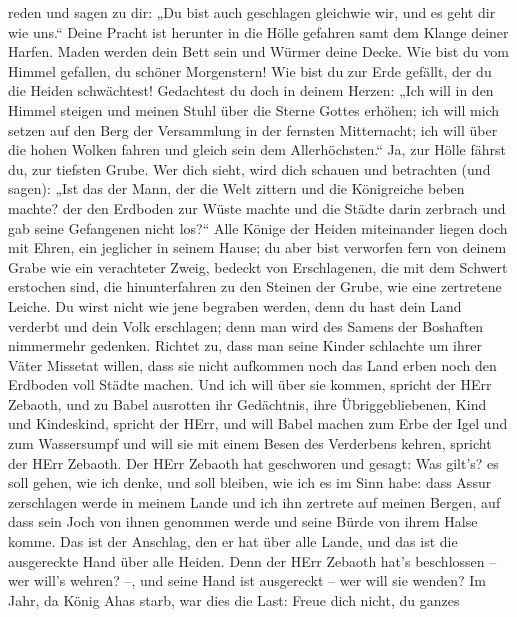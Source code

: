 reden und sagen zu dir: „Du bist auch geschlagen gleichwie wir, und es
geht dir wie uns.``  Deine Pracht ist herunter in die Hölle
gefahren samt dem Klange deiner Harfen. Maden werden dein Bett sein und
Würmer deine Decke.  Wie bist du vom Himmel gefallen, du
schöner Morgenstern! Wie bist du zur Erde gefällt, der du die Heiden
schwächtest!  Gedachtest du doch in deinem Herzen: „Ich
will in den Himmel steigen und meinen Stuhl über die Sterne Gottes
erhöhen;  ich will mich setzen auf den Berg der Versammlung
in der fernsten Mitternacht; ich will über die hohen Wolken fahren und
gleich sein dem Allerhöchsten.``  Ja, zur Hölle fährst du,
zur tiefsten Grube.  Wer dich sieht, wird dich schauen und
betrachten (und sagen): „Ist das der Mann, der die Welt zittern und die
Königreiche beben machte?  der den Erdboden zur Wüste
machte und die Städte darin zerbrach und gab seine Gefangenen nicht
los?{}``  Alle Könige der Heiden miteinander liegen doch
mit Ehren, ein jeglicher in seinem Hause;  du aber bist
verworfen fern von deinem Grabe wie ein verachteter Zweig, bedeckt von
Erschlagenen, die mit dem Schwert erstochen sind, die hinunterfahren zu
den Steinen der Grube, wie eine zertretene Leiche.  Du
wirst nicht wie jene begraben werden, denn du hast dein Land verderbt
und dein Volk erschlagen; denn man wird des Samens der Boshaften
nimmermehr gedenken.  Richtet zu, dass man seine Kinder
schlachte um ihrer Väter Missetat willen, dass sie nicht aufkommen noch
das Land erben noch den Erdboden voll Städte machen.  Und
ich will über sie kommen, spricht der HErr Zebaoth, und zu Babel
ausrotten ihr Gedächtnis, ihre Übriggebliebenen, Kind und Kindeskind,
spricht der HErr,  und will Babel machen zum Erbe der Igel
und zum Wassersumpf und will sie mit einem Besen des Verderbens kehren,
spricht der HErr Zebaoth.  Der HErr Zebaoth hat geschworen
und gesagt: Was gilt's? es soll gehen, wie ich denke, und soll bleiben,
wie ich es im Sinn habe:  dass Assur zerschlagen werde in
meinem Lande und ich ihn zertrete auf meinen Bergen, auf dass sein Joch
von ihnen genommen werde und seine Bürde von ihrem Halse komme.
 Das ist der Anschlag, den er hat über alle Lande, und das
ist die ausgereckte Hand über alle Heiden.  Denn der HErr
Zebaoth hat's beschlossen -- wer will's wehren? --, und seine Hand ist
ausgereckt -- wer will sie wenden?  Im Jahr, da König Ahas
starb, war dies die Last:  Freue dich nicht, du ganzes
